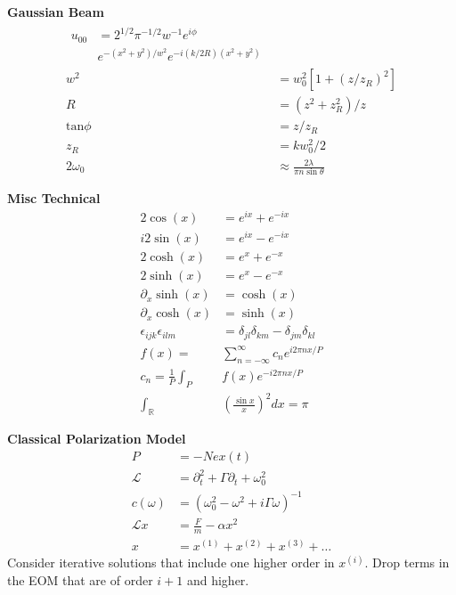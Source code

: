 \documentclass[12pt]{article}
\begin{document}
\begin{multicols}{3}
\textbf{Gaussian Beam}
\begin{align}
  \begin{split}
    u_{00} &{}= 2^{1/2}\pi^{-1/2}w^{-1}e^{i\phi}\\
    &e^{-(x^2+y^2)/w^2}e^{-i(k/2R)(x^2+y^2)}
  \end{split}\\
  w^2 &= w_0^2[1+{(z/z_R)}^2]\\
  R &= (z^2 + z_R^2) / z\\
  \textrm{tan}\phi &= z/z_R\\
  z_R &= k w_0^2 / 2\\
  2 \omega_0 &\approx \frac{2\lambda}{\pi n\sin\theta}
\end{align}

\textbf{Misc Technical}
\begin{align}
  2\cos(x) &= e^{ix} + e^{-ix}\\
  i2\sin(x) &= e^{ix} - e^{-ix}\\
  2\cosh(x) &= e^x + e^{-x}\\
  2\sinh(x) &= e^x - e^{-x}\\
  \partial_x \sinh(x) &= \cosh(x)\\
  \partial_x \cosh(x) &= \sinh(x)\\
  \epsilon_{ijk} \epsilon_{ilm} &= \delta_{jl} \delta_{km} - \delta_{jm} \delta_{kl}\\
  f(x) = &\sum_{n = -\infty}^{\infty} c_n e^{i2\pi n x / P}\\
  c_n = \frac{1}{P} \int_{P} &f(x) e^{-i2\pi n x / P}\\
  \int_{\mathbb{R}} &(\frac{\sin x}{x})^2dx = \pi
\end{align}


\textbf{Classical Polarization Model}
\begin{align}
P &= -Nex(t)\\
\mathcal{L} &= \partial_t^2 + \Gamma\partial_t + \omega_0^2\\
c(\omega) &= (\omega_0^2 - \omega^2 + i\Gamma\omega)^{-1}\\
\mathcal{L}x &= \frac{F}{m} - \alpha x^2\\
x &= x^{(1)} + x^{(2)} + x^{(3)} + \dots
\end{align}
Consider iterative solutions that include one higher order in $x^{(i)}$. Drop terms in the
EOM that are of order $i + 1$ and higher.

\end{multicols}
\end{document}
